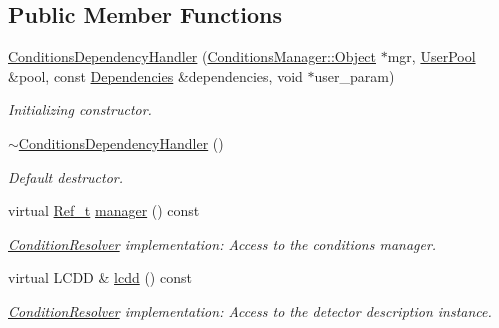 \subsection*{Public Member Functions}
\begin{DoxyCompactItemize}
\item 
\hyperlink{class_d_d4hep_1_1_conditions_1_1_conditions_dependency_handler_a955647ff8dc9227dc10953d9accf2d62}{ConditionsDependencyHandler} (\hyperlink{class_d_d4hep_1_1_conditions_1_1_conditions_manager_object}{ConditionsManager::Object} $\ast$mgr, \hyperlink{class_d_d4hep_1_1_conditions_1_1_user_pool}{UserPool} \&pool, const \hyperlink{class_d_d4hep_1_1_conditions_1_1_conditions_dependency_collection}{Dependencies} \&dependencies, void $\ast$user\_\-param)
\begin{DoxyCompactList}\small\item\em Initializing constructor. \item\end{DoxyCompactList}\item 
\hyperlink{class_d_d4hep_1_1_conditions_1_1_conditions_dependency_handler_ae67007fc5c43f4ad2092cca1c6247d78}{$\sim$ConditionsDependencyHandler} ()
\begin{DoxyCompactList}\small\item\em Default destructor. \item\end{DoxyCompactList}\item 
virtual \hyperlink{class_d_d4hep_1_1_handle}{Ref\_\-t} \hyperlink{class_d_d4hep_1_1_conditions_1_1_conditions_dependency_handler_a2dde95f51874115f7a3c2ae055c7718b}{manager} () const 
\begin{DoxyCompactList}\small\item\em \hyperlink{class_d_d4hep_1_1_conditions_1_1_condition_resolver}{ConditionResolver} implementation: Access to the conditions manager. \item\end{DoxyCompactList}\item 
virtual LCDD \& \hyperlink{class_d_d4hep_1_1_conditions_1_1_conditions_dependency_handler_afef4a9e239622497629139c66a6ab7df}{lcdd} () const 
\begin{DoxyCompactList}\small\item\em \hyperlink{class_d_d4hep_1_1_conditions_1_1_condition_resolver}{ConditionResolver} implementation: Access to the detector description instance. \item\end{DoxyCompactList}\item 

\end{DoxyCompactItemize}
